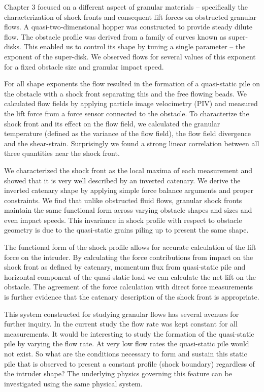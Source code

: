 Chapter 3 focused on a different aspect of granular materials – specifically the characterization of shock fronts and consequent lift forces on obstructed granular flows. A quasi-two-dimensional hopper was constructed to provide steady dilute flow. The obstacle profile was derived from a family of curves known as super-disks. This enabled us to control its shape by tuning a single parameter – the exponent of the super-disk. We observed flows for several values of this exponent for a fixed obstacle size and granular impact speed. 

For all shape exponents the flow resulted in the formation of a quasi-static pile on the obstacle with a shock front separating this and the free flowing beads. We calculated flow fields by applying particle image velocimetry (PIV) and measured the lift force from a force sensor connected to the obstacle. To characterize the shock front and its effect on the flow field, we calculated the granular temperature (defined as the variance of the flow field), the flow field divergence and the shear-strain. Surprisingly we found a strong linear correlation between all three quantities near the shock front. 

We characterized the shock front as the local maxima of each measurement and showed that it is very well described by an inverted catenary. We derive the inverted catenary shape by applying simple force balance arguments and proper constraints. We find that unlike obstructed fluid flows, granular shock fronts maintain the same functional form across varying obstacle shapes and sizes and even impact speeds. This invariance in shock profile with respect to obstacle geometry is due to the quasi-static grains piling up to present the same shape. 

The functional form of the shock profile allows for accurate calculation of the lift force on the intruder. By calculating the force contributions from impact on the shock front as defined by catenary, momentum flux from quasi-static pile and horizontal component of the quasi-static load we can calculate the net lift on the obstacle. The agreement of the force calculation with direct force measurements is further evidence that the catenary description of the shock front is appropriate. 

This system constructed for studying granular flows has several avenues for further inquiry. In the current study the flow rate was kept constant for all measurements. It would be interesting to study the formation of the quasi-static pile by varying the flow rate. At very low flow rates the quasi-static pile would not exist. So what are the conditions necessary to form and sustain this static pile that is observed to present a constant profile (shock boundary) regardless of the intruder shape? The underlying physics governing this feature can be investigated using the same physical system. 

